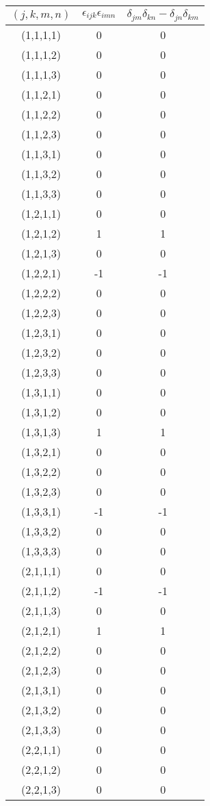\begin{longtable}{ccc}
\hline
$(j,k,m,n)$ & $\epsilon_{ijk}\epsilon_{imn}$ & $\delta_{jm}\delta_{kn} - \delta_{jn}\delta_{km}$ \\
\hline
(1,1,1,1) & 0  & 0 \\
(1,1,1,2) & 0  & 0 \\
(1,1,1,3) & 0  & 0 \\
(1,1,2,1) & 0  & 0 \\
(1,1,2,2) & 0  & 0 \\
(1,1,2,3) & 0  & 0 \\
(1,1,3,1) & 0  & 0 \\
(1,1,3,2) & 0  & 0 \\
(1,1,3,3) & 0  & 0 \\
(1,2,1,1) & 0  & 0 \\
(1,2,1,2) & 1  & 1 \\
(1,2,1,3) & 0  & 0 \\
(1,2,2,1) & -1  & -1 \\
(1,2,2,2) & 0  & 0 \\
(1,2,2,3) & 0  & 0 \\
(1,2,3,1) & 0  & 0 \\
(1,2,3,2) & 0  & 0 \\
(1,2,3,3) & 0  & 0 \\
(1,3,1,1) & 0  & 0 \\
(1,3,1,2) & 0  & 0 \\
(1,3,1,3) & 1  & 1 \\
(1,3,2,1) & 0  & 0 \\
(1,3,2,2) & 0  & 0 \\
(1,3,2,3) & 0  & 0 \\
(1,3,3,1) & -1  & -1 \\
(1,3,3,2) & 0  & 0 \\
(1,3,3,3) & 0  & 0 \\
(2,1,1,1) & 0  & 0 \\
(2,1,1,2) & -1  & -1 \\
(2,1,1,3) & 0  & 0 \\
(2,1,2,1) & 1  & 1 \\
(2,1,2,2) & 0  & 0 \\
(2,1,2,3) & 0  & 0 \\
(2,1,3,1) & 0  & 0 \\
(2,1,3,2) & 0  & 0 \\
(2,1,3,3) & 0  & 0 \\
(2,2,1,1) & 0  & 0 \\
(2,2,1,2) & 0  & 0 \\
(2,2,1,3) & 0  & 0 \\

\end{longtable}
